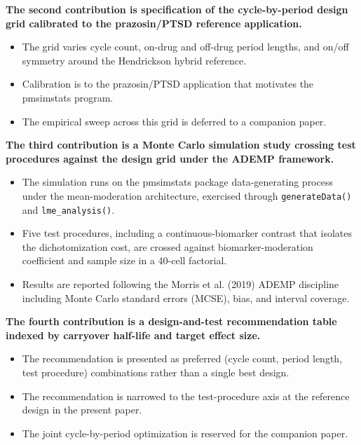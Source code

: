\documentclass[
  11pt,
]{article}
\begin{document}
\textbf{The second contribution is specification of the cycle-by-period design grid calibrated to the prazosin/PTSD reference application.}

\begin{itemize}\setlength{\itemsep}{2pt}\setlength{\parskip}{0pt}
\item The grid varies cycle count, on-drug and off-drug period lengths, and on/off symmetry around the Hendrickson hybrid reference.
\item Calibration is to the prazosin/PTSD application that motivates the pmsimstats program.
\item The empirical sweep across this grid is deferred to a companion paper.
\end{itemize}

\textbf{The third contribution is a Monte Carlo simulation study crossing test procedures against the design grid under the ADEMP framework.}

\begin{itemize}\setlength{\itemsep}{2pt}\setlength{\parskip}{0pt}
\item The simulation runs on the pmsimstats package data-generating process under the mean-moderation architecture, exercised through \texttt{generateData()} and \texttt{lme\_analysis()}.
\item Five test procedures, including a continuous-biomarker contrast that isolates the dichotomization cost, are crossed against biomarker-moderation coefficient and sample size in a 40-cell factorial.
\item Results are reported following the Morris et al. (2019) ADEMP discipline including Monte Carlo standard errors (MCSE), bias, and interval coverage.
\end{itemize}

\textbf{The fourth contribution is a design-and-test recommendation table indexed by carryover half-life and target effect size.}

\begin{itemize}\setlength{\itemsep}{2pt}\setlength{\parskip}{0pt}
\item The recommendation is presented as preferred (cycle count, period length, test procedure) combinations rather than a single best design.
\item The recommendation is narrowed to the test-procedure axis at the reference design in the present paper.
\item The joint cycle-by-period optimization is reserved for the companion paper.
\end{itemize}
\end{document}

